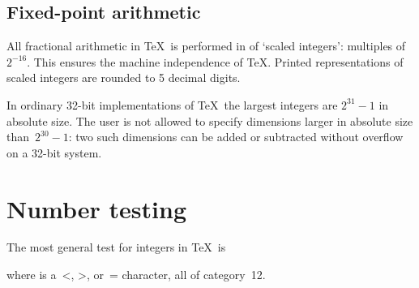 \documentclass[twoside,letterpaper,openright]{rapport3}
\begin{document}
\subsection{Fixed-point arithmetic}

All fractional arithmetic in \TeX\ is performed in
of `scaled integers': multiples of~$2^{-16}$.
This ensures the machine independence of \TeX.
Printed representations of scaled integers are rounded
to 5 decimal digits.

In ordinary 32-bit implementations of \TeX\ the largest
integers are $2^{31}-1$ in absolute size.
The user is not allowed to specify
dimensions larger in absolute size than~$2^{30}-1$: two
such dimensions can be added or subtracted without
overflow on a 32-bit system.

\section{Number testing}

The most general test for integers in \TeX\ is
\begin{disp}\end{disp}
where  is a~\n<, \n>, or~\n= character,
all of category~12.
\end{document}
